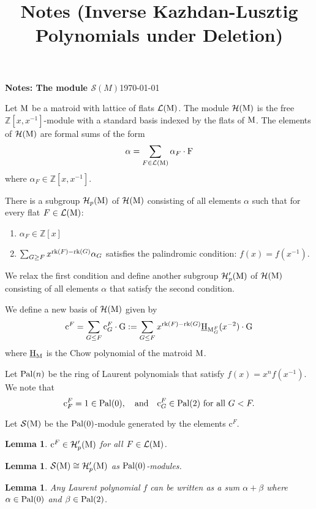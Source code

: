 \documentclass[11pt]{article}
\title{\texorpdfstring{Notes (Inverse Kazhdan-Lusztig Polynomials under Deletion)}{Notes (Inverse Kazhdan-Lusztig Polynomials under Deletion)}}
\newcommand{\calH}{\mathcal{H}}
\newcommand{\calS}{\mathcal{S}}
\newcommand{\chow}{\normalfont\text{\underline{H}}}
\newcommand{\rank}{\normalfont\text{rk}}
\newcommand{\M}{\normalfont\text{M}}
\newcommand{\ZZ}{\mathbb{Z}}
\newcommand{\Ebasis}[1]{\mathrm{#1}}
\newcommand{\Cbasis}[1]{\mathrm{c}^{#1}}
\newcommand{\pal}{\normalfont\text{Pal}}
\newtheorem{lemma}[theorem]{Lemma}
\theoremstyle{remark}
\begin{document}
{\textbf{Notes: The module \(\mathcal{S}(M)\)}}\hfill {\small{\today}}

\hrulefill %

Let \(\M\) be a matroid with lattice of flats \(\mathcal{L}(\M)\).
The module \(\calH(\M)\) is the free \(\ZZ[x, x^{-1}]\)-module with a standard basis
indexed by the flats of \(\M\). The elements of \(\calH(\M)\) are formal sums of the form
\[
\alpha = \sum_{F \in \mathcal{L}(\M)} \alpha_F \cdot\Ebasis{F}
\]
where \(\alpha_F \in \ZZ[x, x^{-1}]\).

There is a subgroup \(\calH_p(\M)\) of \(\calH(\M)\) consisting of all
elements \(\alpha\) such that for every flat \(F \in \mathcal{L}(\M)\):
\begin{enumerate}
    \item \(\alpha_F \in \ZZ[x]\)
    \item \(\sum_{G \ge F} x^{\rank(F)-\rank(G)} \alpha_G\)
    satisfies the palindromic condition: \(f(x) = f(x^{-1})\).
\end{enumerate}

We relax the first condition and define another subgroup
\(\calH'_p(\M)\) of \(\calH(\M)\) consisting of all elements
\(\alpha\) that satisfy the second condition.

We define a new basis of
\(\calH(\M)\) given by
\[
\Cbasis{F} = \sum_{G\le F} \Cbasis{F}_G\cdot\Ebasis{G} :=
\sum_{G \le F} x^{\rank(F)-\rank(G)} \chow_{\M_G^F}(x^{-2}) \cdot \Ebasis{G}
\]
where \(\chow_{\M}\) is the Chow polynomial of the matroid \(\M\).

Let \(\pal(n)\) be the ring of Laurent polynomials that satisfy
\(f(x) = x^n f(x^{-1})\).
We note that 
\[\Cbasis{F}_F = 1 \in \pal(0),\quad\text{and}\quad\Cbasis{F}_G
\in \pal(2)\ \text{for all}\ G < F.\]

Let \(\calS(\M)\)
be the \(\pal(0)\)-module generated by the elements \(\Cbasis{F}\).

\begin{lemma}\label{lemma:cinS(M)}
    \(\Cbasis{F} \in \calH'_p(\M)\) for all \(F \in \mathcal{L}(\M)\).
\end{lemma}
\begin{lemma}\label{lemma:S(M)is H'_p}
    \(\calS(\M) \cong \calH'_p(\M)\) as \(\pal(0)\)-modules.
\end{lemma}
\begin{lemma}\label{lemma:S(M)is H_p}
    Any Laurent polynomial
    \(f\) can be written as a sum \(\alpha + \beta\) where
    \(\alpha \in \pal(0)\) and \(\beta \in \pal(2)\).
\end{lemma}
\end{document}
